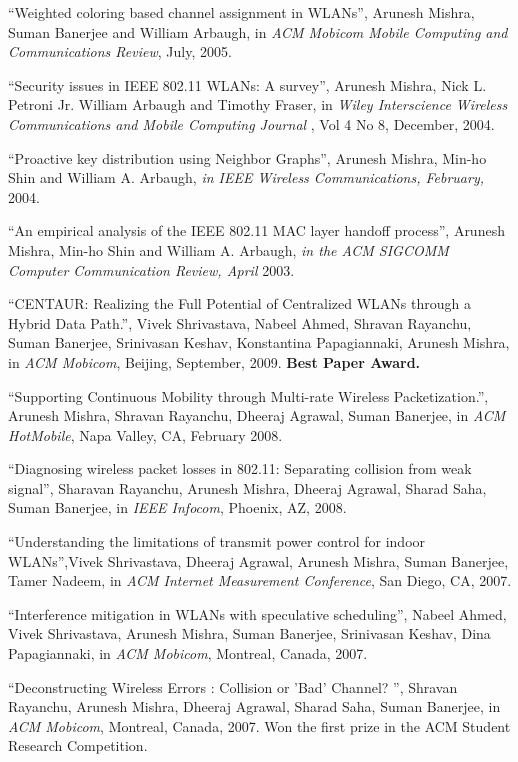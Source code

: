 \begin{resume}
\mybullet ``Weighted coloring based channel assignment in WLANs'', Arunesh Mishra, Suman Banerjee and William Arbaugh,
in {\em ACM Mobicom Mobile Computing and Communications Review}, July, 2005.

\mybullet ``Security issues in IEEE 802.11 WLANs: A survey'', Arunesh Mishra, Nick L. Petroni Jr. William Arbaugh and Timothy Fraser, 
in {\em  Wiley Interscience Wireless Communications and Mobile Computing Journal }, Vol 4 No 8, December, 2004.

\mybullet ``Proactive key distribution using Neighbor Graphs'', Arunesh Mishra,  Min-ho Shin and William A. Arbaugh,
{\em in IEEE Wireless Communications, February,} 2004.

\mybullet ``An empirical analysis of the IEEE 802.11 MAC layer handoff process'', Arunesh Mishra,  
Min-ho Shin and William A. Arbaugh, {\em in the ACM SIGCOMM Computer Communication Review, April} 2003. 

\vspace{-0.7cm}

\mybullet ``CENTAUR: Realizing the Full Potential of Centralized WLANs through a Hybrid Data Path.'', Vivek Shrivastava, Nabeel Ahmed, Shravan Rayanchu, Suman Banerjee, Srinivasan Keshav, Konstantina Papagiannaki, Arunesh Mishra,
in {\it ACM Mobicom}, Beijing, September, 2009. {\bf Best Paper Award.}

\mybullet ``Supporting Continuous Mobility through Multi-rate Wireless Packetization.'', Arunesh Mishra, Shravan Rayanchu, Dheeraj Agrawal, Suman Banerjee, 
in {\it ACM HotMobile}, Napa Valley, CA, February 2008.

\mybullet ``Diagnosing wireless packet losses in 802.11: Separating collision from weak signal'', Sharavan Rayanchu, Arunesh Mishra, Dheeraj Agrawal, Sharad Saha,
Suman Banerjee, in {\it IEEE Infocom}, Phoenix, AZ, 2008.

\mybullet ``Understanding the limitations of transmit power control for indoor WLANs'',Vivek Shrivastava, Dheeraj Agrawal, Arunesh Mishra, Suman Banerjee, Tamer Nadeem, in {\it ACM Internet Measurement Conference}, San Diego, CA, 2007.

\mybullet ``Interference mitigation in WLANs with speculative scheduling'', Nabeel Ahmed, Vivek Shrivastava, Arunesh Mishra,
   Suman Banerjee, Srinivasan Keshav, Dina Papagiannaki, in  {\it ACM Mobicom}, Montreal, Canada, 2007.

\mybullet ``Deconstructing Wireless Errors : Collision or 'Bad' Channel? '', Shravan Rayanchu, Arunesh Mishra, Dheeraj Agrawal, Sharad Saha, Suman Banerjee,
in {\it ACM Mobicom}, Montreal, Canada, 2007. Won the first prize in the {ACM Student Research Competition}.


\end{resume}

